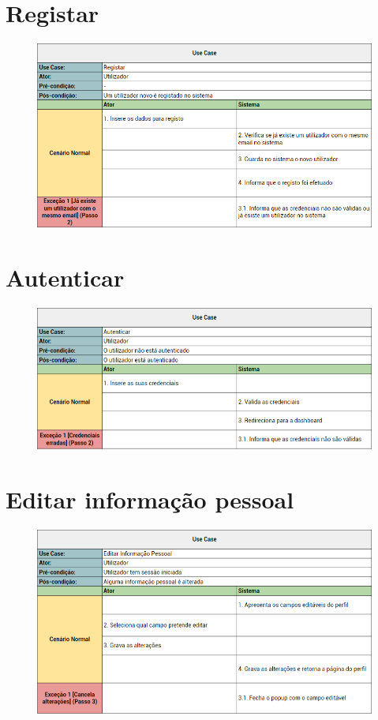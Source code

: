 \documentclass[a4paper]{report}
\begin{document}
    \section{Registar}
        \begin{figure}[H]
        \centering
            \includegraphics[width=\textwidth]{images/usecases/registar.png}
        \end{figure}

    \section{Autenticar}
        \begin{figure}[H]
        \centering
            \includegraphics[width=\textwidth]{images/usecases/autenticar.png}
        \end{figure}

    \section{Editar informação pessoal}
        \begin{figure}[H]
        \centering
            \includegraphics[width=\textwidth]{images/usecases/editar_utilizador.png}
        \end{figure}
\end{document}
